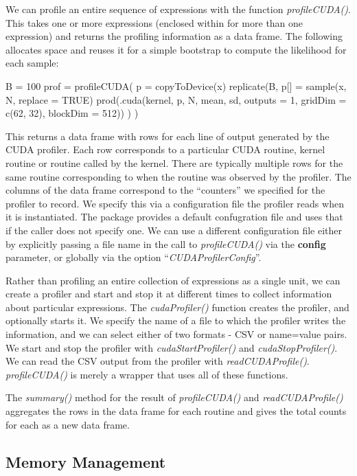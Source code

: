 \documentclass[article]{jss}
\def\R{\proglang{R}}
\def\Rpkg#1{\pkg{#1}}
\def\Rfunc#1{\textsl{#1()}}
\def\Rarg#1{\textbf{#1}}
\def\Roption#1{\dquote{\textsl{#1}}}
\def\dquote#1{``#1''}
\begin{document}
We can profile an entire sequence of \R{} expressions with the \R{}
function \Rfunc{profileCUDA}.  This takes one or more \R{} expressions
(enclosed within {} for more than one expression) and returns the
profiling information as a data frame.
The following allocates space and reuses it for a simple bootstrap
to compute the likelihood for each sample:  
\begin{RCode}
B = 100
prof = profileCUDA( {
  p = copyToDevice(x)
  replicate(B, {
      p[] = sample(x, N, replace = TRUE)
      prod(.cuda(kernel, p, N, mean, sd, outputs = 1,  
                   gridDim = c(62, 32), blockDim = 512))
  })
})
\end{RCode}
This returns a data frame with rows for each line of output generated
by the CUDA profiler.  Each row corresponds to a particular CUDA
routine, kernel routine or routine called by the kernel.  There are
typically multiple rows for the same routine corresponding to when the
routine was observed by the profiler.  The columns of the data frame
correspond to the \dquote{counters} we specified for the profiler to
record.  We specify this via a configuration file the profiler reads
when it is instantiated. The \Rpkg{RCUDA} package provides a default
confugration file and uses that if the caller does not specify one.
We can use a different configuration file either by explicitly passing
a file name in the call to \Rfunc{profileCUDA} via the \Rarg{config}
parameter, or globally via the \R{} option
\Roption{CUDAProfilerConfig}.


Rather than profiling an entire collection of \R{} expressions as a
single unit, we can create a profiler and start and stop it at
different times to collect information about particular \R{}
expressions.  The \Rfunc{cudaProfiler} function creates the profiler,
and optionally starts it.  We specify the name of a file to which the
profiler writes the information, and we can select either of two
formats - CSV or name=value pairs.  We start and stop the profiler
with \Rfunc{cudaStartProfiler} and \Rfunc{cudaStopProfiler}.  We can
read the CSV output from the profiler with \Rfunc{readCUDAProfile}.
\Rfunc{profileCUDA} is merely a wrapper that uses all of these
functions.

The \Rfunc{summary} method for the result of \Rfunc{profileCUDA} and
\Rfunc{readCUDAProfile} aggregates the rows in the data frame for each
routine and gives the total counts for each as a new data frame.

\subsection{Memory Management}
\end{document}
